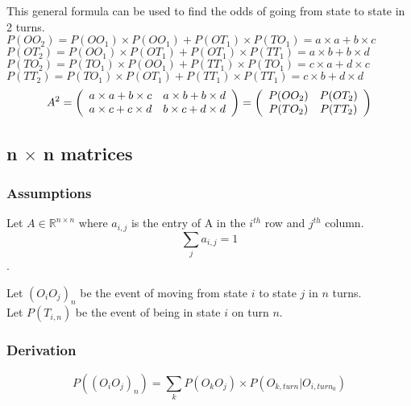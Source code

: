 This general formula can be used to find the odds of going from state to state in 2 turns.\\
$P(OO_2) = P(OO_1) \times P(OO_1)+P(OT_1) \times P(TO_1) = a \times a + b \times c$\\
$P(OT_2) = P(OO_1) \times P(OT_1)+P(OT_1) \times P(TT_1) = a \times b + b \times d$\\
$P(TO_2) = P(TO_1) \times P(OO_1)+P(TT_1) \times P(TO_1) = c \times a + d \times c$\\
$P(TT_2) = P(TO_1) \times P(OT_1)+P(TT_1) \times P(TT_1) = c \times b + d \times d$
\[
A^2 =
\left(
\begin{array}{c c}
a \times a+b \times c & a \times b+b \times d \\
a \times c+c \times d & b \times c+d \times d \\
\end{array}
\right)
=
\left(
\begin{array}{c c}
P(OO_2) & P(OT_2) \\
P(TO_2) & P(TT_2) \\
\end{array}
\right) \]

\subsection{n $\times$ n matrices}
\subsubsection{Assumptions}
Let  $A \in \mathbb{R}^{n \times n}$ where $a_{i,j}$ is the entry of A in the $i^{th}$ row and $j^{th}$ column.\\
$$\sum_{j} a_{i,j} = 1$$.

Let $(O_iO_j)_n$ be the event of moving from state $i$ to state $j$ in $n$ turns.\\
Let $P(T_{i,n})$ be the event of being in state $i$ on turn $n$.

\subsubsection{Derivation}
$$P((O_iO_j)_n) =  \sum_{k} P(O_kO_j) \times P(O_{k,turn}|O_{i,turn_0})$$
